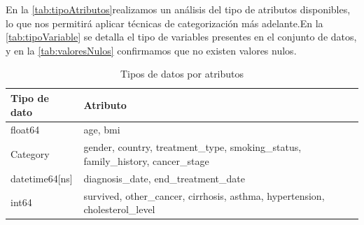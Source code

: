 \documentclass[10pt,journal,compsoc]{IEEEtran}
\begin{document}
En la \autoref{tab:tipoAtributos}realizamos un análisis del tipo de atributos disponibles, lo que nos permitirá aplicar técnicas de categorización más adelante.En la \autoref{tab:tipoVariable} se detalla el tipo de variables presentes en el conjunto de datos, y en la \autoref{tab:valoresNulos} confirmamos que no existen valores nulos.





\begin{table}[h!]
\centering
\begin{tabularx}{\columnwidth}{|l|X|}
\hline
\textbf{Tipo de dato}   & \textbf{Atributo}  \\ \hline
float64                 & age, bmi    \\ \hline
Category                & gender, country, treatment\_type, smoking\_status, family\_history, cancer\_stage  \\ \hline
datetime64[ns]          & diagnosis\_date, end\_treatment\_date   \\ \hline
int64                   & survived, other\_cancer, cirrhosis, asthma, hypertension, cholesterol\_level   \\ \hline
\end{tabularx}
\caption{Tipos de datos por atributos}
\label{tab:tipoAtributos}
\end{table}
\end{document}
